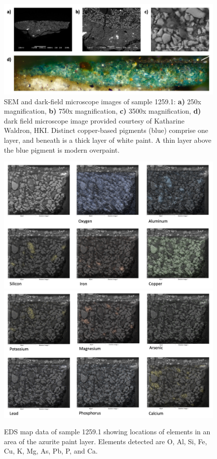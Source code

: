 \begin{figure}[H]
  \centering
  \includegraphics[width=\linewidth]{1259-1_imgs}
\caption[SEM and dark-field microscope images of sample 1259.1.]{SEM and dark-field microscope images of sample 1259.1: \textbf{a)} 250x magnification, \textbf{b)} 750x magnification, \textbf{c)} 3500x magnification, \textbf{d)} dark field microscope image provided courtesy of Katharine Waldron, HKI. Distinct copper-based pigments (blue) comprise one layer, and beneath is a thick layer of white paint. A thin layer above the blue pigment is modern overpaint.}
\label{fig:1259.1_imgs}
\end{figure}

\begin{figure}[H]
\centering
\begin{minipage}[t]{\linewidth}
  \centering
  \includegraphics[width=0.9\linewidth]{1259-1_mapdata_1}
\hfill
\includegraphics[width=0.9\linewidth]{1259-1_mapdata_2}
\hfill
\end{minipage}
\caption[EDS map data, sample 1259.1.]{EDS map data of sample 1259.1 showing locations of elements in an area of the azurite paint layer. Elements detected are O, Al, Si, Fe, Cu, K, Mg, As, Pb, P, and Ca.}
\label{fig:1259.1_mapdata}
\end{figure}

